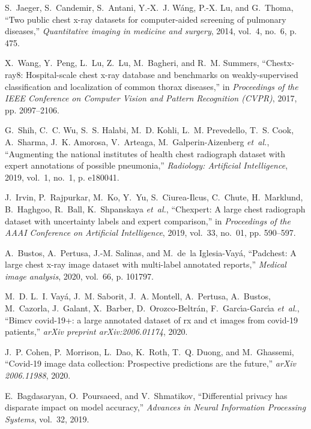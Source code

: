 \documentclass[journal]{IEEEtran}
\begin{document}
\begin{thebibliography}{100}
S.~Jaeger, S.~Candemir, S.~Antani, Y.-X.~J. W{\'a}ng, P.-X. Lu, and G.~Thoma, ``Two public chest x-ray datasets for computer-aided screening of pulmonary diseases,'' \emph{Quantitative imaging in medicine and surgery}, 2014, vol.~4, no.~6, p. 475.

X.~Wang, Y.~Peng, L.~Lu, Z.~Lu, M.~Bagheri, and R.~M. Summers, ``Chestx-ray8: Hospital-scale chest x-ray database and benchmarks on weakly-supervised classification and localization of common thorax diseases,'' in
  \emph{Proceedings of the IEEE Conference on Computer Vision and Pattern Recognition (CVPR)}, 2017, pp. 2097--2106.

G.~Shih, C.~C. Wu, S.~S. Halabi, M.~D. Kohli, L.~M. Prevedello, T.~S. Cook,
  A.~Sharma, J.~K. Amorosa, V.~Arteaga, M.~Galperin-Aizenberg \emph{et~al.},
  ``Augmenting the national institutes of health chest radiograph dataset with
  expert annotations of possible pneumonia,'' \emph{Radiology: Artificial
  Intelligence}, 2019, vol.~1, no.~1, p. e180041.

J.~Irvin, P.~Rajpurkar, M.~Ko, Y.~Yu, S.~Ciurea-Ilcus, C.~Chute, H.~Marklund,
  B.~Haghgoo, R.~Ball, K.~Shpanskaya \emph{et~al.}, ``Chexpert: A large chest
  radiograph dataset with uncertainty labels and expert comparison,'' in
  \emph{Proceedings of the AAAI Conference on Artificial Intelligence}, 2019, vol.~33,
  no.~01, pp. 590--597.

A.~Bustos, A.~Pertusa, J.-M. Salinas, and M.~de~la Iglesia-Vay{\'a},
  ``Padchest: A large chest x-ray image dataset with multi-label annotated
  reports,'' \emph{Medical image analysis}, 2020, vol.~66, p. 101797.

M.~D. L.~I. Vay{\'a}, J.~M. Saborit, J.~A. Montell, A.~Pertusa, A.~Bustos,
  M.~Cazorla, J.~Galant, X.~Barber, D.~Orozco-Beltr{\'a}n,
  F.~Garc{\'\i}a-Garc{\'\i}a \emph{et~al.}, ``Bimcv covid-19+: a large
  annotated dataset of rx and ct images from covid-19 patients,'' \emph{arXiv
  preprint arXiv:2006.01174}, 2020.

J.~P. Cohen, P.~Morrison, L.~Dao, K.~Roth, T.~Q. Duong, and M.~Ghassemi,
  ``Covid-19 image data collection: Prospective predictions are the future,''
  \emph{arXiv 2006.11988}, 2020.

E.~Bagdasaryan, O.~Poursaeed, and V.~Shmatikov, ``Differential privacy has
  disparate impact on model accuracy,'' \emph{Advances in Neural Information Processing Systems}, vol.~32, 2019.


\end{thebibliography}
\end{document}
